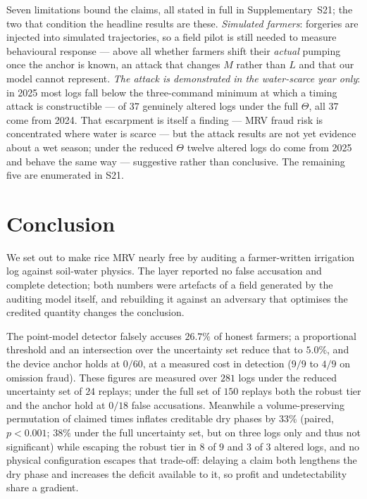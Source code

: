 Seven limitations bound the claims, all stated in full in Supplementary~S21;
the two that condition the headline results are these. \emph{Simulated
farmers}: forgeries are injected into simulated trajectories, so a field pilot
is still needed to measure behavioural response --- above all whether farmers
shift their \emph{actual} pumping once the anchor is known, an attack that
changes $M$ rather than $L$ and that our model cannot represent. \emph{The
attack is demonstrated in the water-scarce year only}: in 2025 most logs fall
below the three-command minimum at which a timing attack is constructible ---
of $37$ genuinely altered logs under the full $\Theta$, all $37$ come from
2024. That escarpment is itself a finding --- MRV fraud risk is concentrated
where water is scarce --- but the attack results are not yet evidence about a
wet season; under the reduced $\Theta$ twelve altered logs do come from 2025
and behave the same way --- suggestive rather than conclusive. The remaining
five are enumerated in S21.

\section{Conclusion}

We set out to make rice MRV nearly free by auditing a farmer-written irrigation
log against soil-water physics. The layer reported no false accusation and complete detection; both numbers were artefacts of a field
generated by the auditing model itself, and rebuilding it against an adversary
that optimises the credited quantity changes the conclusion.

The point-model detector falsely accuses $26.7\%$ of honest farmers; a
proportional threshold and an intersection over the uncertainty set reduce that
to $5.0\%$, and the device anchor holds at $0/60$, at a measured cost in
detection ($9/9$ to $4/9$ on omission fraud). These figures are measured over
$281$ logs under the reduced uncertainty set of $24$ replays; under the full set
of $150$ replays both the robust tier and the anchor hold at $0/18$ false
accusations. Meanwhile a volume-preserving permutation of
claimed times inflates creditable dry phases by $33\%$ (paired, $p<0.001$;
$38\%$ under the full uncertainty set, but on three logs only and thus not
significant) while
escaping the robust tier in $8$ of $9$ and $3$ of $3$ altered logs, and no
physical configuration escapes that trade-off: delaying a claim both lengthens
the dry phase and increases the deficit available to it, so profit and
undetectability share a gradient.

